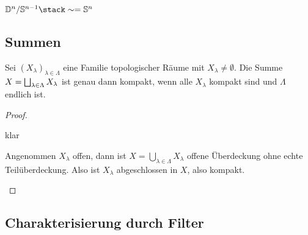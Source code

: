\begin{ex}
	$\D^n / \S^{n-1} \homeomorphic \S^n$
\end{ex}

\subsection{Summen}

\begin{st}
	Sei $(X_\lambda)_{\lambda\in\Lambda}$ eine Familie topologischer Räume mit $X_\lambda \neq \emptyset$.
	Die Summe $X = \bigsqcup_{\lambda \in \Lambda} X_\lambda$ ist genau dann kompakt, wenn alle $X_\lambda$ kompakt sind und $\Lambda$ endlich ist.
	\begin{proof}
		\begin{segnb}[„$\impliedby$“]
			klar
		\end{segnb}
		\begin{segnb}[„$\implies$“]
			Angenommen $X_\lambda$ offen, dann ist $X = \bigcup_{\lambda\in\Lambda} X_\lambda$ offene Überdeckung ohne echte Teilüberdeckung.
			Also ist $X_\lambda$ abgeschlossen in $X$, also kompakt.
		\end{segnb}
	\end{proof}
\end{st}

\subsection{Charakterisierung durch Filter}

